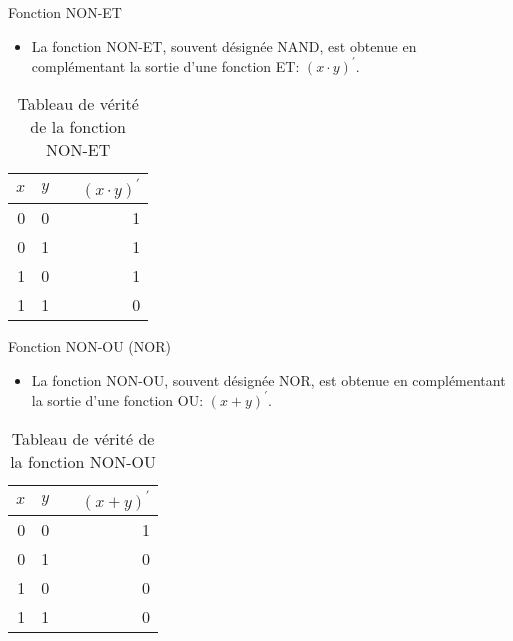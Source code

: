 \documentclass[presentation]{beamer}
\begin{document}
\begin{frame}[label={sec:org0b0ab54}]{Fonction NON-ET}
\begin{itemize}
\item La fonction NON-ET, souvent désignée NAND, est obtenue en complémentant la sortie d'une fonction ET: \((x \cdot y)^\prime\).
\end{itemize}

\begin{table}[htbp]
\caption{\label{tab:orgafdacc7}Tableau de vérité de la fonction NON-ET}
\centering
\begin{tabular}{rrlr}
\(x\) & \(y\) &  & \((x \cdot y)^\prime\)\\
\hline
0 & 0 &  & 1\\
0 & 1 &  & 1\\
1 & 0 &  & 1\\
1 & 1 &  & 0\\
\end{tabular}
\end{table}
\end{frame}

\begin{frame}[label={sec:org0ab3aa0}]{Fonction NON-OU (NOR)}
\begin{itemize}
\item La fonction NON-OU, souvent désignée NOR, est obtenue en complémentant la sortie d'une fonction OU: \((x + y)^\prime\).
\end{itemize}

\begin{table}[htbp]
\caption{\label{tab:org0688c2f}Tableau de vérité de la fonction NON-OU}
\centering
\begin{tabular}{rrlr}
\(x\) & \(y\) &  & \((x + y)^\prime\)\\
\hline
0 & 0 &  & 1\\
0 & 1 &  & 0\\
1 & 0 &  & 0\\
1 & 1 &  & 0\\
\end{tabular}
\end{table}
\end{frame}
\end{document}
